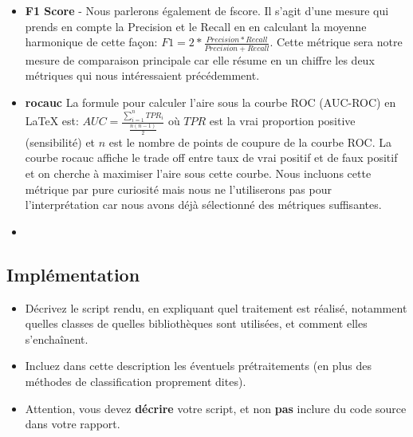 \documentclass{ceri/sty/rapport}
\begin{document}
\begin{itemize}
	\item \textbf{F1 Score} - Nous parlerons également de fscore. Il s'agit d'une mesure qui prends en compte la Precision et le Recall en en calculant la moyenne harmonique de cette façon: $F1 = 2*\frac{Precision*Recall}{Precision+Recall}$. Cette métrique sera notre mesure de comparaison principale car elle résume en un chiffre les deux métriques qui nous intéressaient précédemment.

	\item \textbf{rocauc} La formule pour calculer l'aire sous la courbe ROC (AUC-ROC) en LaTeX est: $AUC = \frac{\sum_{i=1}^{n} TPR_i}{\frac{n(n-1)}{2}}$ où $TPR$ est la vrai proportion positive (sensibilité) et $n$ est le nombre de points de coupure de la courbe ROC. La courbe rocauc affiche le trade off entre taux de vrai positif et de faux positif et on cherche à maximiser l'aire sous cette courbe. Nous incluons cette métrique par pure curiosité mais nous ne l'utiliserons pas pour l'interprétation car nous avons déjà sélectionné des métriques suffisantes.

	\item \textbf{}
\end{itemize}

\subsection{Implémentation}
\begin{itemize}
	\item Décrivez le script rendu, en expliquant quel traitement est réalisé, notamment quelles classes de quelles bibliothèques sont utilisées, et comment elles s'enchaînent.
    \item Incluez dans cette description les éventuels prétraitements (en plus des méthodes de classification proprement dites).
	\item Attention, vous devez \textbf{décrire} votre script, et non \textbf{pas} inclure du code source dans votre rapport.
\end{itemize}



















\end{document}
